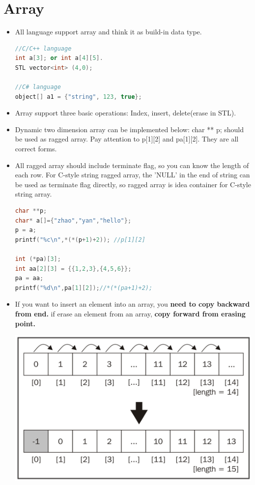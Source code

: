 \documentclass[a4paper,12pt,twoside]{book}
\begin{document}
\section{Array}
\begin{itemize}
\item All language support array and think it as build-in data type.  
\begin{lstlisting}[frame=single, language=c++]
//C/C++ language
int a[3]; or int a[4][5].  
STL vector<int> (4,0);
  
//C# language 
object[] a1 = {"string", 123, true};
\end{lstlisting}

\item Array support three basic operations: Index, insert, delete(erase in STL).  

\item Dynamic two dimension array can be implemented below:  char ** p; should be used as ragged array. Pay attention to p[1][2] and pa[1][2]. They are all correct forms.

\item All ragged array should include terminate flag, so you can know the length of each row.  For C-style string ragged array, the 'NULL' in the end of string can be used as terminate flag directly, so ragged array is idea container for C-style string array. 

\begin{lstlisting}[frame=single, language=c++]
char **p;
char* a[]={"zhao","yan","hello"};
p = a;
printf("%c\n",*(*(p+1)+2)); //p[1][2]

int (*pa)[3];
int aa[2][3] = {{1,2,3},{4,5,6}};
pa = aa;
printf("%d\n",pa[1][2]);//*(*(pa+1)+2);
\end{lstlisting} 

\item If you want to insert an element into an array, you  \textbf{need to copy backward from end. }
if erase an element from an array, \textbf{copy forward from erasing point.}

\includegraphics[scale=0.35]{pics/array_insert.png} \newline


\end{itemize}
\end{document}
